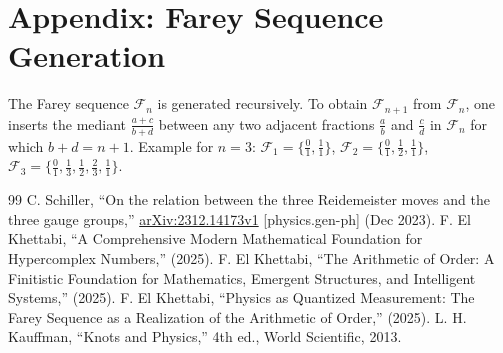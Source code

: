 \documentclass{article}
\theoremstyle{remark}
\begin{document}
\appendix
\section{Appendix: Farey Sequence Generation}
The Farey sequence $\mathcal{F}_n$ is generated recursively. To obtain $\mathcal{F}_{n+1}$ from $\mathcal{F}_n$, one inserts the mediant $\frac{a+c}{b+d}$ between any two adjacent fractions $\frac{a}{b}$ and $\frac{c}{d}$ in $\mathcal{F}_n$ for which $b+d = n+1$. Example for $n=3$: $\mathcal{F}_1 = \{ \frac{0}{1}, \frac{1}{1} \}$, $\mathcal{F}_2 = \{ \frac{0}{1}, \frac{1}{2}, \frac{1}{1} \}$, $\mathcal{F}_3 = \{ \frac{0}{1}, \frac{1}{3}, \frac{1}{2}, \frac{2}{3}, \frac{1}{1} \}$.

\begin{thebibliography}{99}
     C. Schiller, ``On the relation between the three Reidemeister moves and the three gauge groups,'' \href{https://arxiv.org/abs/2312.14173}{arXiv:2312.14173v1} [physics.gen-ph] (Dec 2023).
     F. El Khettabi, ``A Comprehensive Modern Mathematical Foundation for Hypercomplex Numbers,'' (2025).
     F. El Khettabi, ``The Arithmetic of Order: A Finitistic Foundation for Mathematics, Emergent Structures, and Intelligent Systems,'' (2025).
     F. El Khettabi, ``Physics as Quantized Measurement: The Farey Sequence as a Realization of the Arithmetic of Order,'' (2025).
     L. H. Kauffman, ``Knots and Physics,'' 4th ed., World Scientific, 2013.
\end{thebibliography}
\end{document}
